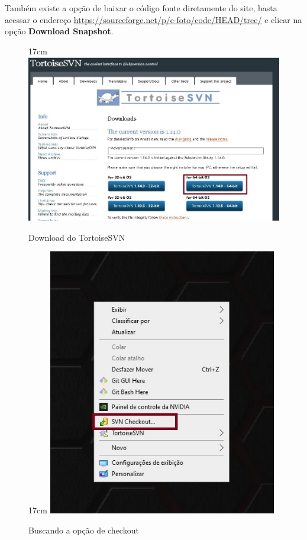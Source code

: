 Também existe a opção de baixar o código fonte diretamente do site, basta acessar o endereço \url {https://sourceforge.net/p/e-foto/code/HEAD/tree/} e clicar na opção \textbf{Download Snapshot}.
 
\begin{figure}[!ht]{17cm}
 	\centering
 	\includegraphics[width=12cm]{Figuras/tortoise.jpg}
 	\caption{Download do TortoiseSVN} \label{fig:tortoise}
\end{figure}

\begin{figure}[!ht]{17cm}
	\centering
	\includegraphics[width=10cm]{Figuras/checkout.jpg}
	\caption{Buscando a opção de checkout} \label{fig:checkout}
\end{figure}

